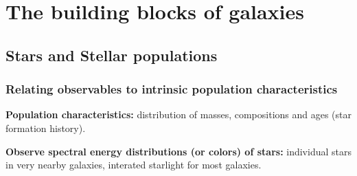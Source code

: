 \documentclass[12pt]{article}
\begin{document}
\section{The building blocks of galaxies}

\subsection*{Stars and Stellar populations}

\subsubsection*{Relating observables to intrinsic population characteristics}
\begin{itemize*} %
    \item \textbf{Population characteristics:} distribution of masses, compositions
        and ages (star formation history).
    \item \textbf{Observe spectral energy distributions (or colors) of stars:}
        individual stars in very nearby galaxies, interated starlight
        for most galaxies.
\end{itemize*}%
\end{document}
